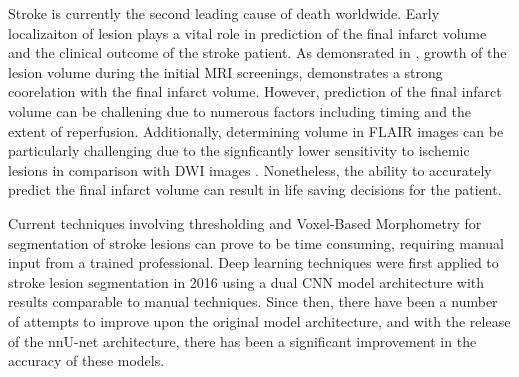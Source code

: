 \par
Stroke is currently the second leading cause of death worldwide. 
Early localizaiton of lesion plays a vital role in prediction of
the final infarct volume and the clinical outcome of the stroke
patient. As demonsrated in \cite{wheeler_early_2013}, growth of the lesion
volume during the initial MRI screenings, demonstrates a strong coorelation
with the final infarct volume. However, prediction of the final infarct volume
can be challening due to numerous factors including timing and the extent
of reperfusion. Additionally, determining volume in FLAIR images can be particularly
challenging due to the signficantly lower sensitivity to ischemic lesions in comparison
with DWI images \cite{kamalian_stroke_2019}\cite{noguchi_mri_1997}. Nonetheless, the ability to
accurately predict the final infarct volume can result in life saving decisions for the patient.
\par
Current techniques involving thresholding and Voxel-Based Morphometry \cite{noauthor_voxel-based_nodate}
for segmentation of stroke lesions can prove to be time consuming,
requiring manual input from a trained professional. Deep learning techniques were first
applied to stroke lesion segmentation in 2016 using a dual CNN model architecture
with results comparable to manual techniques. Since then, there have been a number of attempts
to improve upon the original model architecture, and with the release of the nnU-net\cite{isensee_nnu-net_2021}
architecture, there has been a significant improvement in the accuracy of these models. 



